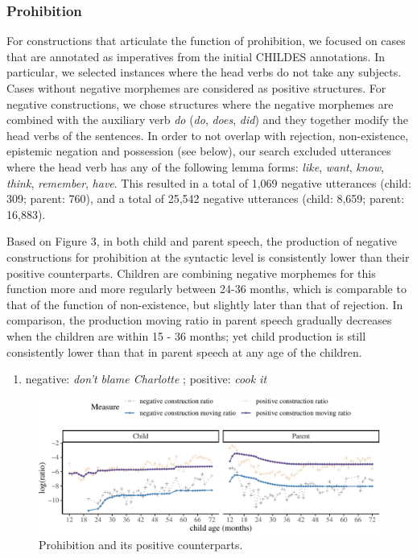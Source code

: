 \documentclass[
  english,
  man,floatsintext]{apa6}
\providecommand{\tightlist}{%
  \setlength{\itemsep}{0pt}\setlength{\parskip}{0pt}}
\begin{document}
\hypertarget{prohibition}{%
\subsubsection{Prohibition}\label{prohibition}}

For constructions that articulate the function of prohibition, we focused on cases that are annotated as imperatives from the initial CHILDES annotations. In particular, we selected instances where the head verbs do not take any subjects. Cases without negative morphemes are considered as positive structures. For negative constructions, we chose structures where the negative morphemes are combined with the auxiliary verb \emph{do} (\emph{do}, \emph{does}, \emph{did}) and they together modify the head verbs of the sentences. In order to not overlap with rejection, non-existence, epistemic negation and possession (see below), our search excluded utterances where the head verb has any of the following lemma forms: \emph{like}, \emph{want}, \emph{know}, \emph{think}, \emph{remember}, \emph{have}. This resulted in a total of 1,069 negative utterances (child: 309; parent: 760), and a total of 25,542 negative utterances (child: 8,659; parent: 16,883).

Based on Figure 3, in both child and parent speech, the production of negative constructions for prohibition at the syntactic level is consistently lower than their positive counterparts. Children are combining negative morphemes for this function more and more regularly between 24-36 months, which is comparable to that of the function of non-existence, but slightly later than that of rejection. In comparison, the production moving ratio in parent speech gradually decreases when the children are within 15 - 36 months; yet child production is still consistently lower than that in parent speech at any age of the children.

\begin{enumerate}
\def\labelenumi{(\arabic{enumi})}
\setcounter{enumi}{6}
\tightlist
\item
  negative: \emph{don't blame Charlotte} ; positive: \emph{cook it}
\end{enumerate}

\begin{figure}[H]

{\centering \includegraphics{neg_construction_article_files/figure-latex/prohibition-1} 

}

\caption{Prohibition and its positive counterparts.}\label{fig:prohibition}
\end{figure}
\end{document}
